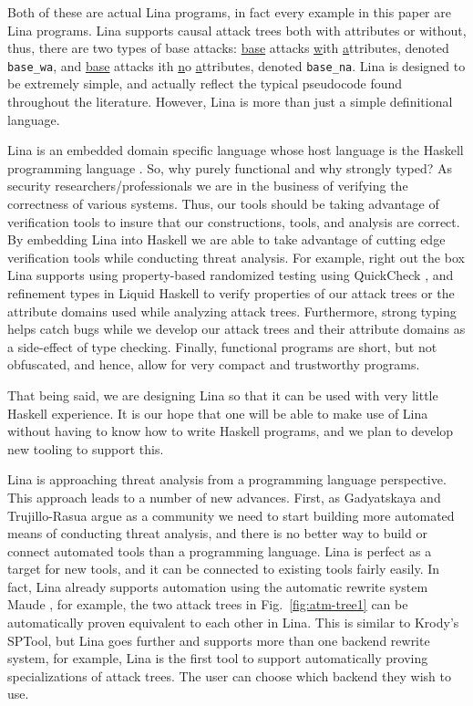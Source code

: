 Both of these are actual Lina programs, in fact every example in this
paper are Lina programs. Lina supports causal attack trees both with
attributes or without, thus, there are two types of base attacks:
\underline{base} attacks \underline{w}ith \underline{a}ttributes,
denoted \verb!base_wa!, and \underline{base} attacks ith
\underline{n}o \underline{a}ttributes, denoted \verb!base_na!.  Lina
is designed to be extremely simple, and actually reflect the typical
pseudocode found throughout the literature.  However, Lina is more
than just a simple definitional language.

Lina is an embedded domain specific language whose host language is
the Haskell programming language \cite{jones2003haskell}.  So, why
purely functional and why strongly typed?  As security
researchers/professionals we are in the business of verifying the
correctness of various systems. Thus, our tools should be taking
advantage of verification tools to insure that our constructions,
tools, and analysis are correct.  By embedding Lina into Haskell we
are able to take advantage of cutting edge verification tools while
conducting threat analysis.  For example, right out the box Lina
supports using property-based randomized testing using QuickCheck
\cite{Claessen:2011:QLT:1988042.1988046}, and refinement types in
Liquid Haskell \cite{Vazou:2014:RTH:2692915.2628161} to verify
properties of our attack trees or the attribute domains used while
analyzing attack trees.  Furthermore, strong typing helps catch bugs
while we develop our attack trees and their attribute domains as a
side-effect of type checking.  Finally, functional programs are short,
but not obfuscated, and hence, allow for very compact and trustworthy
programs.

That being said, we are designing Lina so that it can be used with
very little Haskell experience.  It is our hope that one will be able
to make use of Lina without having to know how to write Haskell
programs, and we plan to develop new tooling to support this.

Lina is approaching threat analysis from a programming language
perspective.  This approach leads to a number of new advances.  First,
as Gadyatskaya and Trujillo-Rasua \cite{10.1007/978-3-319-74860-3_9}
argue as a community we need to start building more automated means of
conducting threat analysis, and there is no better way to build or
connect automated tools than a programming language.  Lina is perfect
as a target for new tools, and it can be connected to existing tools
fairly easily.  In fact, Lina already supports automation using the
automatic rewrite system Maude \cite{clavel2005maude}, for example,
the two attack trees in Fig.~\ref{fig:atm-tree1} can be automatically
proven equivalent to each other in Lina.  This is similar to Krody's
\cite{Kordy2017} SPTool, but Lina goes further and supports more than
one backend rewrite system, for example, Lina is the first tool to
support automatically proving specializations of attack trees.  The
user can choose which backend they wish to use.

